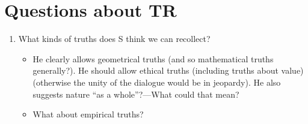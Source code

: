 \documentclass[10 pt]{article}
\begin{document}

\section*{Questions about TR}
\begin{enumerate}
\item What kinds of truths does S think we can recollect?
\begin{itemize}\item{He clearly allows geometrical truths (and so mathematical truths generally?). He should allow ethical truths (including truths about value) (otherwise the unity of the dialogue would be in jeopardy). He also suggests nature ``as a whole''?---What could that mean?}\item{What about empirical truths?}\end{itemize}
\end{enumerate}
\end{document}
